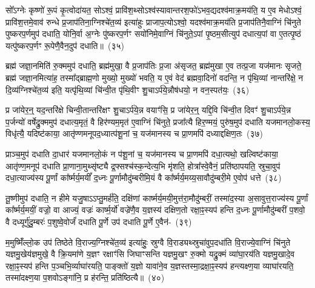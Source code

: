 सो᳚\-ऽग्नेः कृष्णो॑ रू॒पं कृ॒त्वोदा॑यत॒ सो\-ऽश्वं॒ प्रावि॑श॒थ्सो\-ऽश्व॑स्यावान्तरश॒फो॑\-ऽभव॒द्यदश्व॑माक्र॒मय॑ति॒ य ए॒व मेधो\-ऽश्वं॒ प्रावि॑श॒त्तमे॒वाव॑ रुन्धे प्र॒जा\-प॑तिना॒ग्निश्चे॑त॒व्य॑ इत्या॑हुः प्राजाप॒त्यो\-ऽश्वो॒ यदश्व॑माक्र॒मय॑ति प्र॒जा\-प॑तिनै॒वाग्निं चि॑नुते पुष्करप॒र्णमुप॑ दधाति॒ योनि॒र्वा अ॒ग्नेः पु॑ष्करप॒र्णꣳ सयो॑निमे॒वाग्निं चि॑नुते॒\-ऽपां पृ॒ष्ठम॒सीत्युप॑ दधात्य॒पां वा ए॒तत्पृ॒ष्ठं यत्पु॑ष्करप॒र्णꣳ रू॒पेणै॒वैन॒दुप॑ दधाति॥~(३५)\ip

{\anuvakamend[{इन्द्रः॑ प॒शुका॑मस्य भवत्यविश॒थ्सयो॑निं विꣳश॒तिश्च॑}]}

ब्रह्म॑ जज्ञा॒नमिति॑ रु॒क्ममुप॑ दधाति॒ ब्रह्म॑मुखा॒ वै प्र॒जा\-प॑तिः प्र॒जा अ॑सृजत॒ ब्रह्म॑मुखा ए॒व तत्प्र॒जा यज॑मानः सृजते॒ ब्रह्म॑ जज्ञा॒नमित्या॑ह॒ तस्मा᳚द्\-ब्राह्म॒णो मुख्यो॒ मुख्यो॑ भवति॒ य ए॒वं वेद॑ ब्रह्मवा॒दिनो॑ वदन्ति॒ न पृ॑थि॒व्यां नान्तरि॑क्षे॒ न दि॒व्य॑ग्निश्चे॑त॒व्य॑ इति॒ यत्पृ॑थि॒व्यां चि॑न्वी॒त पृ॑थि॒वीꣳ शु॒चा\-ऽर्प॑ये॒न्नौष॑धयो॒ न वन॒स्पत॑यः॒~(३६)\ip

प्र जा॑येर॒न्॒ यद॒न्तरि॑क्षे चिन्वी॒तान्तरि॑क्षꣳ शु॒चा\-ऽर्प॑ये॒न्न वयाꣳ॑सि॒ प्र जा॑येर॒न्॒ यद्दि॒वि चि॑न्वी॒त दिवꣳ॑ शु॒चा\-ऽर्प॑ये॒न्न प॒र्जन्यो॑ वर्\mbox{}षेद्रु॒क्ममुप॑ दधात्य॒मृतं॒ वै हिर॑ण्यम॒मृत॑ ए॒वाग्निं चि॑नुते॒ प्रजा᳚त्यै हिर॒ण्मयं॒ पुरु॑ष॒मुप॑ दधाति यजमानलो॒कस्य॒ विधृ॑त्यै॒ यदिष्ट॑काया॒ आतृ॑ण्णमनूपद॒ध्यात्प॑शू॒नां च॒ यज॑मानस्य च प्रा॒णमपि॑ दध्याद्दक्षिण॒तः~(३७)\ip

प्राञ्च॒मुप॑ दधाति दा॒धार॑ यजमानलो॒कं न प॑शू॒नां च॒ यज॑मानस्य च प्रा॒णमपि॑ दधा॒त्यथो॒ खल्विष्ट॑काया॒ आतृ॑ण्ण॒मनूप॑ दधाति प्रा॒णाना॒मुथ्सृ॑ष्ट्यै द्र॒फ्सश्च॑स्क॒न्देत्य॒भि मृ॑शति॒ होत्रा᳚स्वे॒वैनं॒ प्रति॑\-ष्ठापयति॒ स्रुचा॒वुप॑ दधा॒त्याज्य॑स्य पू॒र्णां का᳚र्ष्मर्य॒मयीं᳚ द॒ध्नः पू॒र्णामौदु॑म्बरीमि॒यं वै का᳚र्ष्मर्य॒मय्य॒सावौदु॑म्बरी॒मे ए॒वोप॑ धत्ते~(३८)\ip

तू॒ष्णीमुप॑ दधाति॒ न हीमे यजु॒षाऽऽप्तु॒मर्\mbox{}ह॑ति॒ दक्षि॑णां कार्ष्मर्य॒मयी॒मुत्त॑रा॒मौदु॑म्बरीं॒ तस्मा॑द॒स्या अ॒सावुत्त॒राज्य॑स्य पू॒र्णां का᳚र्ष्मर्य॒मयीं॒ वज्रो॒ वा आज्यं॒ वज्रः॑ कार्ष्म॒र्यो॑ वज्रे॑णै॒व य॒ज्ञस्य॑ दक्षिण॒तो रक्षा॒ꣴ॒स्यप॑ हन्ति द॒ध्नः पू॒र्णामौदु॑म्बरीं प॒शवो॒ वै दध्यूर्गु॑दु॒म्बरः॑ प॒शुष्वे॒वोर्जं॑ दधाति पू॒र्णे उप॑ दधाति पू॒र्णे ए॒वैन॑-~(३९)\ip

म॒मुष्मिँ॑ल्लो॒क उप॑ तिष्ठेते वि॒राज्य॒ग्निश्चे॑त॒व्य॑ इत्या॑हुः॒ स्रुग्वै वि॒राड्यथ्स्रुचा॑वुप॒\-दधा॑ति वि॒राज्ये॒वाग्निं चि॑नुते यज्ञमु॒खेय॑ज्ञमुखे॒ वै क्रि॒यमा॑णे य॒ज्ञꣳ रक्षाꣳ॑सि जिघाꣳसन्ति यज्ञमु॒खꣳ रु॒क्मो यद्रु॒क्मं व्या॑घा॒रय॑ति यज्ञमु॒खादे॒व रक्षा॒ꣴ॒स्यप॑ हन्ति प॒ञ्चभि॒र्व्याघा॑रयति॒ पाङ्क्तो॑ य॒ज्ञो यावा॑ने॒व य॒ज्ञस्तस्मा॒द्रक्षा॒ꣴ॒स्यप॑ हन्त्यक्ष्ण॒या व्याघा॑रयति॒ तस्मा॑दक्ष्ण॒या प॒शवो\-ऽङ्गा॑नि॒ प्र ह॑रन्ति॒ प्रति॑ष्ठित्यै॥~(४०)\ip

